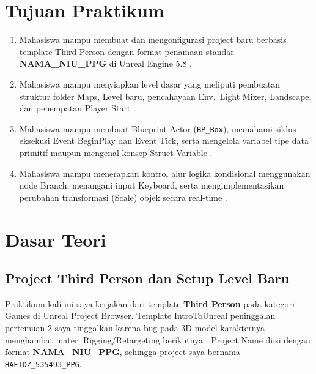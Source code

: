 \documentclass[a4paper,oneside,12pt]{report}
\begin{document}
\thispagestyle{empty}
\clearpage
{}
\thispagestyle{empty}

\tableofcontents
\clearpage

\setcounter{page}{3}

\chapter[Tujuan Praktikum]{Tujuan Praktikum}
\begin{enumerate}
   \item Mahasiswa mampu membuat dan mengonfigurasi project baru berbasis template Third Person dengan format penamaan standar \textbf{NAMA\_NIU\_PPG} di Unreal Engine 5.8 \cite{modul3}.
   \item Mahasiswa mampu menyiapkan level dasar yang meliputi pembuatan struktur folder Maps, Level baru, pencahayaan Env.\ Light Mixer, Landscape, dan penempatan Player Start \cite{modul3,epic-levels}.
   \item Mahasiswa mampu membuat Blueprint Actor (\texttt{BP\_Box}), memahami siklus eksekusi Event BeginPlay dan Event Tick, serta mengelola variabel tipe data primitif maupun mengenal konsep Struct Variable \cite{modul3,epic-variables}.
   \item Mahasiswa mampu menerapkan kontrol alur logika kondisional menggunakan node Branch, menangani input Keyboard, serta mengimplementasikan perubahan transformasi (Scale) objek secara real-time \cite{modul3,epic-flow}.
\end{enumerate}
\clearpage

\chapter{Dasar Teori}

\section{Project Third Person dan Setup Level Baru}
Praktikum kali ini saya kerjakan dari template \textbf{Third Person} pada kategori Games di Unreal Project Browser. Template IntroToUnreal peninggalan pertemuan 2 saya tinggalkan karena bug pada 3D model karakternya menghambat materi Rigging/Retargeting berikutnya \cite{modul3}. Project Name diisi dengan format \textbf{NAMA\_NIU\_PPG}, sehingga project saya bernama \texttt{HAFIDZ\_535493\_PPG}.
\end{document}
